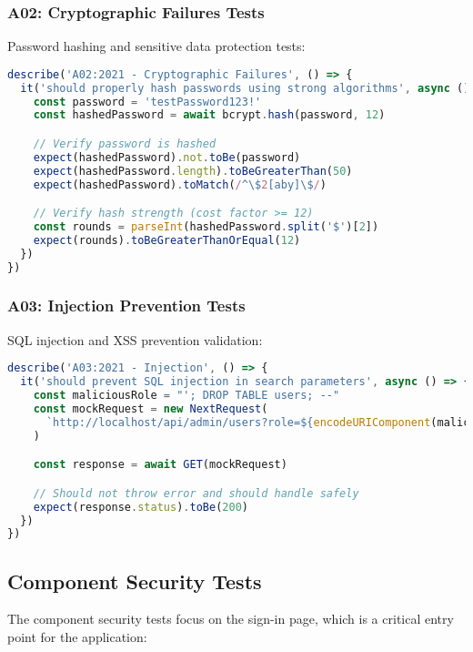 \documentclass[12pt]{article}
\begin{document}
\subsubsection{A02: Cryptographic Failures Tests}
Password hashing and sensitive data protection tests:

\begin{lstlisting}[language=typescript, caption=Cryptographic Security Test]
describe('A02:2021 - Cryptographic Failures', () => {
  it('should properly hash passwords using strong algorithms', async () => {
    const password = 'testPassword123!'
    const hashedPassword = await bcrypt.hash(password, 12)

    // Verify password is hashed
    expect(hashedPassword).not.toBe(password)
    expect(hashedPassword.length).toBeGreaterThan(50)
    expect(hashedPassword).toMatch(/^\$2[aby]\$/)

    // Verify hash strength (cost factor >= 12)
    const rounds = parseInt(hashedPassword.split('$')[2])
    expect(rounds).toBeGreaterThanOrEqual(12)
  })
})
\end{lstlisting}

\subsubsection{A03: Injection Prevention Tests}
SQL injection and XSS prevention validation:

\begin{lstlisting}[language=typescript, caption=Injection Prevention Test]
describe('A03:2021 - Injection', () => {
  it('should prevent SQL injection in search parameters', async () => {
    const maliciousRole = "'; DROP TABLE users; --"
    const mockRequest = new NextRequest(
      `http://localhost/api/admin/users?role=${encodeURIComponent(maliciousRole)}`
    )

    const response = await GET(mockRequest)

    // Should not throw error and should handle safely
    expect(response.status).toBe(200)
  })
})
\end{lstlisting}

\subsection{Component Security Tests}

The component security tests focus on the sign-in page, which is a critical entry point for the application:
\end{document}
